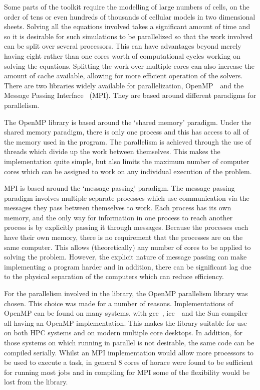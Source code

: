 Some parts of the toolkit require the modelling of large numbers of cells, on
the order of tens or even hundreds of thousands of cellular models in two
dimensional sheets.  Solving all the equations involved takes a significant
amount of time and so it is desirable for such simulations to be parallelized so
that the work involved can be split over several processors.  This can have
advantages beyond merely having eight rather than one cores worth of
computational cycles working on solving the equations.  Splitting the work over
multiple cores can also increase the amount of cache available, allowing for
more efficient operation of the solvers.
There are two libraries widely available for parallelization,
OpenMP~\cite{OpenMP}\ and the Message Passing Interface~\cite{MPI} (MPI).
They are based around different paradigms for parallelism.

The OpenMP library is based around the `shared memory' paradigm.
Under the shared memory paradigm, there is only one process and this has access
to all of the memory used in the program.
The parallelism is achieved through the use of threads which divide up the work
between themselves.
This makes the implementation quite simple, but also limits the maximum number
of computer cores which can be assigned to work on any individual execution of
the problem.

MPI is based around the `message passing' paradigm.
The message passing paradigm involves multiple separate processes which use
communication via the messages they pass between themselves to work.
Each process has its own memory, and the only way for information in one process
to reach another process is by explicitly passing it through messages.
Because the processes each have their own memory, there is no requirement that
the processes are on the same computer.
This allows (theoretically) any number of cores to be applied to solving the
problem.
However, the explicit nature of message passing can make implementing a program
harder and in addition, there can be significant lag due to the physical
separation of the computers which can reduce efficiency.

For the parallelism involved in the library, the OpenMP parallelism library was
chosen.
This choice was made for a number of reasons.
Implementations of OpenMP can be found on many systems, with gcc~\cite{gcc},
icc~\cite{icc}\ and the
Sun compiler all having an OpenMP implementation.
This makes the library suitable for use on both HPC systems and on modern
multiple core desktops.
In addition, for those systems on which running in parallel is not desirable,
the same code can be compiled serially.
Whilst an MPI implementation would allow more processors to be used to execute a
task, in general 8 cores of horace were found to be sufficient for running most
jobs and in compiling for MPI some of the flexibility would be lost from the
library.

